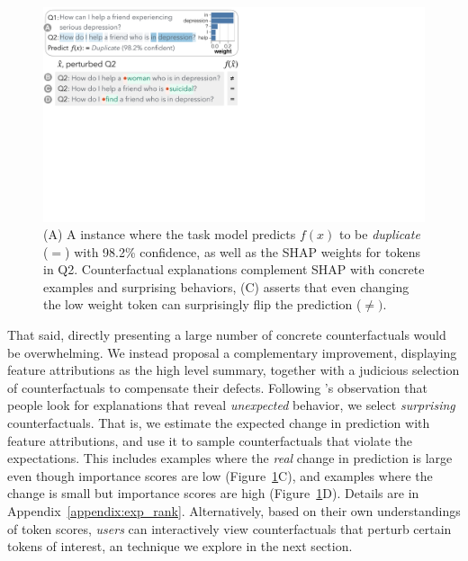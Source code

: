 \begin{figure}[t]
\centering
\includegraphics[trim={0 21cm 33cm 0cm},clip,width=1\columnwidth]{figures/explanation_v2.pdf}
\vspace{-15pt}
\caption{
(A) A \qqp instance where the task model\footnotemark{} predicts $f(x)$ to be \emph{duplicate} ($=$) with 98.2\% confidence, as well as the SHAP weights for tokens in Q2.
Counterfactual explanations complement SHAP with concrete examples and surprising behaviors, \eg (C) asserts that even changing the low weight token  can surprisingly flip the prediction ($\neq)$.
}
\vspace{-10pt}
\label{fig:explanation}
\end{figure}



That said, directly presenting a large number of concrete counterfactuals would be overwhelming.
We instead proposal a complementary improvement, displaying feature attributions as the high level summary, together with a judicious selection of \sysname counterfactuals to compensate their defects.
Following \citet{miller}'s observation that people look for explanations that reveal \emph{unexpected} behavior, we select \emph{surprising} counterfactuals.
That is, we estimate the expected change in prediction with feature attributions, and use it to sample counterfactuals that violate the expectations.
This includes examples where the \emph{real} change in prediction is large even though importance scores are low (Figure~\ref{fig:explanation}C), and examples where the change is small but importance scores are high (Figure~\ref{fig:explanation}D).
Details are in Appendix~\ref{appendix:exp_rank}. 
Alternatively, based on their own understandings of token scores, \emph{users} can interactively view counterfactuals that perturb certain tokens of interest, an technique we explore in the next section. 


